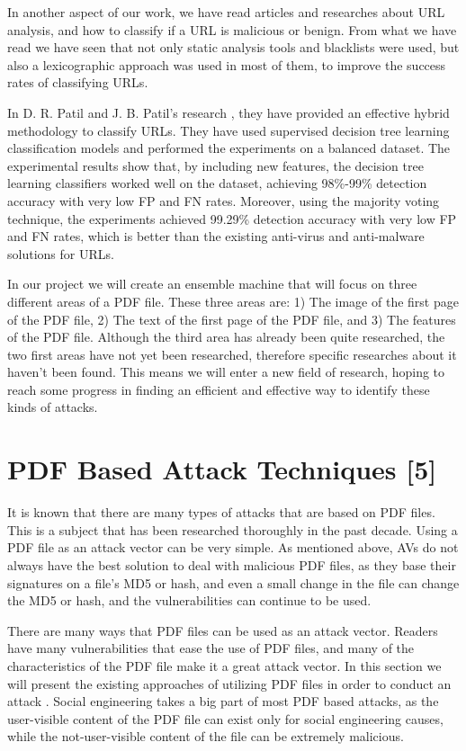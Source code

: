 \documentclass{article}
\begin{document}
\indent In another aspect of our work, we have read articles and researches about URL analysis, and how to classify if a URL is malicious or benign. From what we have read we have seen that not only static analysis tools and blacklists were used, but also a lexicographic approach was used in most of them, to improve the success rates of classifying URLs. 

\clearpage
\newpage

\indent In D. R. Patil and J. B. Patil’s research \cite{patil2018malicious}, they have provided an effective hybrid methodology to classify URLs. They have used supervised decision tree learning classification models and performed the experiments on a balanced dataset. The experimental results show that, by including new features, the decision tree learning classifiers worked well on the dataset, achieving 98\%-99\% detection accuracy with very low FP and FN rates. Moreover, using the majority voting technique, the experiments achieved 99.29\% detection accuracy with very low FP and FN rates, which is better than the existing anti-virus and anti-malware solutions for URLs.

\indent In our project we will create an ensemble machine that will focus on three different areas of a PDF file. These three areas are: 1) The image of the first page of the PDF file, 2) The text of the first page of the PDF file, and 3) The features of the PDF file. Although the third area has already been quite researched, the two first areas have not yet been researched, therefore specific researches about it haven't been found. This means we will enter a new field of research, hoping to reach some progress in finding an efficient and effective way to identify these kinds of attacks. 

\section{PDF Based Attack Techniques [5]}
\indent	It is known that there are many types of attacks that are based on PDF files. This is a subject that has been researched thoroughly in the past decade. Using a PDF file as an attack vector can be very simple. As mentioned above, AVs do not always have the best solution to deal with malicious PDF files, as they base their signatures on a file’s MD5 or hash, and even a small change in the file can change the MD5 or hash, and the vulnerabilities can continue to be used.

\indent There are many ways that PDF files can be used as an attack vector. Readers have many vulnerabilities that ease the use of PDF files, and many of the characteristics of the PDF file make it a great attack vector. In this section we will present the existing approaches of utilizing PDF files in order to conduct an attack \cite{BGU2014malicious}. Social engineering takes a big part of most PDF based attacks, as the user-visible content of the PDF file can exist only for social engineering causes, while the not-user-visible content of the file can be extremely malicious.
\end{document}

